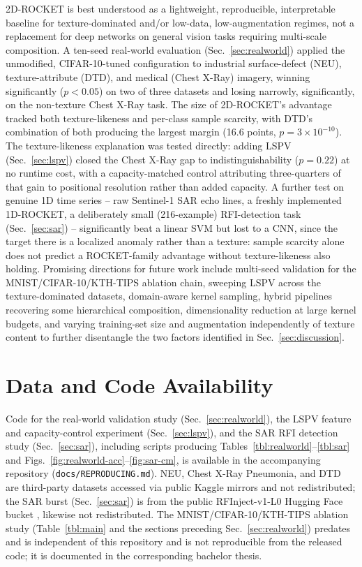 \documentclass[a4paper,fleqn]{cas-sc}
\begin{document}
2D-ROCKET is best understood as a lightweight, reproducible, interpretable baseline for texture-dominated and/or low-data, low-augmentation regimes, not a replacement for deep networks on general vision tasks requiring multi-scale composition. A ten-seed real-world evaluation (Sec.~\ref{sec:realworld}) applied the unmodified, CIFAR-10-tuned configuration to industrial surface-defect (NEU), texture-attribute (DTD), and medical (Chest X-Ray) imagery, winning significantly ($p<0.05$) on two of three datasets and losing narrowly, significantly, on the non-texture Chest X-Ray task. The size of 2D-ROCKET's advantage tracked both texture-likeness and per-class sample scarcity, with DTD's combination of both producing the largest margin (16.6 points, $p=3\times10^{-10}$). The texture-likeness explanation was tested directly: adding LSPV (Sec.~\ref{sec:lspv}) closed the Chest X-Ray gap to indistinguishability ($p=0.22$) at no runtime cost, with a capacity-matched control attributing three-quarters of that gain to positional resolution rather than added capacity. A further test on genuine 1D time series -- raw Sentinel-1 SAR echo lines, a freshly implemented 1D-ROCKET, a deliberately small (216-example) RFI-detection task (Sec.~\ref{sec:sar}) -- significantly beat a linear SVM but lost to a CNN, since the target there is a localized anomaly rather than a texture: sample scarcity alone does not predict a ROCKET-family advantage without texture-likeness also holding. Promising directions for future work include multi-seed validation for the MNIST/CIFAR-10/KTH-TIPS ablation chain, sweeping LSPV across the texture-dominated datasets, domain-aware kernel sampling, hybrid pipelines recovering some hierarchical composition, dimensionality reduction at large kernel budgets, and varying training-set size and augmentation independently of texture content to further disentangle the two factors identified in Sec.~\ref{sec:discussion}.

\section*{Data and Code Availability}
Code for the real-world validation study (Sec.~\ref{sec:realworld}), the LSPV feature and capacity-control experiment (Sec.~\ref{sec:lspv}), and the SAR RFI detection study (Sec.~\ref{sec:sar}), including scripts producing Tables~\ref{tbl:realworld}--\ref{tbl:sar} and Figs.~\ref{fig:realworld-acc}--\ref{fig:sar-cm}, is available in the accompanying repository (\texttt{docs/REPRODUCING.md}). NEU, Chest X-Ray Pneumonia, and DTD are third-party datasets accessed via public Kaggle mirrors and not redistributed; the SAR burst (Sec.~\ref{sec:sar}) is from the public RFInject-v1-L0 Hugging Face bucket \citep{delprete2025rfinject}, likewise not redistributed. The MNIST/CIFAR-10/KTH-TIPS ablation study (Table~\ref{tbl:main} and the sections preceding Sec.~\ref{sec:realworld}) predates and is independent of this repository and is not reproducible from the released code; it is documented in the corresponding bachelor thesis.

\printcredits



\end{document}

